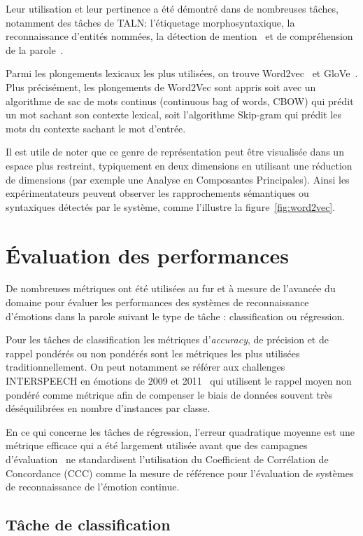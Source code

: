 Leur utilisation et leur pertinence a été démontré dans de nombreuses tâches, notamment des tâches de TALN: l’étiquetage morphosyntaxique, la reconnaissance d’entités nommées, la détection de mention~\cite{Turian2010,Bansal2014} et de compréhension de la parole~\cite{Mesnil2013,Yao2014,Liu2016}.

Parmi les plongements lexicaux les plus utilisées, on trouve Word2vec~\cite{word2vec} et GloVe~\cite{Pennington2014}.
Plus précisément, les plongements de Word2Vec sont appris soit avec un algorithme de sac de mots continus (continuous bag of words, CBOW) qui prédit un mot sachant son contexte lexical, soit l'algorithme Skip-gram qui prédit les mots du contexte sachant le mot d'entrée.

Il est utile de noter que ce genre de représentation peut être visualisée dans un espace plus restreint, typiquement en deux dimensions en utilisant une réduction de dimensions (par exemple une Analyse en Composantes Principales). Ainsi les expérimentateurs peuvent observer les rapprochements sémantiques ou syntaxiques détectés par le système, comme l'illustre la figure~\ref{fig:word2vec}.

\section{Évaluation des performances}
De nombreuses métriques ont été utilisées au fur et à mesure de l'avancée du domaine pour évaluer les performances des systèmes de reconnaissance d'émotions dans la parole suivant le type de tâche : classification ou régression.

Pour les tâches de classification les métriques d'\textit{accuracy}, de précision et de rappel pondérés ou non pondérés sont les métriques les plus utilisées traditionnellement. On peut notamment se référer aux challenges INTERSPEECH en émotions de 2009 et 2011~\cite{Schuller2009,Schuller2011} qui utilisent le rappel moyen non pondéré comme métrique afin de compenser le biais de données souvent très déséquilibrées en nombre d'instances par classe.

En ce qui concerne les tâches de régression, l'erreur quadratique moyenne est une métrique efficace qui a été largement utilisée avant que des campagnes d'évaluation~\cite{AVEC2017} ne standardisent l'utilisation du Coefficient de Corrélation de Concordance (CCC) comme la mesure de référence pour l'évaluation de systèmes de reconnaissance de l'émotion continue.

\subsection{Tâche de classification}

